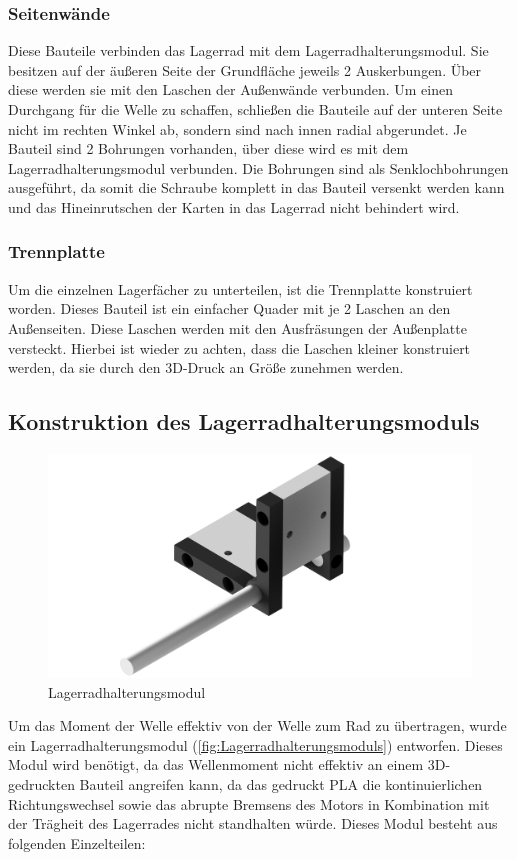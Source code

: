 \subsubsection{Seitenwände}
Diese Bauteile verbinden das Lagerrad mit dem Lagerradhalterungsmodul. Sie besitzen auf der äußeren Seite der Grundfläche
jeweils 2 Auskerbungen. Über diese werden sie mit den Laschen der Außenwände verbunden. Um einen Durchgang für die Welle zu schaffen,
schließen die Bauteile auf der unteren Seite nicht im rechten Winkel ab, sondern sind nach innen radial abgerundet.
Je Bauteil sind 2 Bohrungen vorhanden, über diese wird es mit dem Lagerradhalterungsmodul verbunden.
Die Bohrungen sind als Senklochbohrungen ausgeführt, da somit die Schraube komplett in das Bauteil versenkt werden kann
und das Hineinrutschen der Karten in das Lagerrad nicht behindert wird.

\subsubsection{Trennplatte}
Um die einzelnen Lagerfächer zu unterteilen, ist die Trennplatte konstruiert worden. Dieses Bauteil ist ein einfacher
Quader mit je 2 Laschen an den Außenseiten. Diese Laschen werden mit den Ausfräsungen der Außenplatte versteckt.
Hierbei ist wieder zu achten, dass die Laschen kleiner konstruiert werden, da sie durch den 3D-Druck an Größe zunehmen
werden.

\subsection{Konstruktion des Lagerradhalterungsmoduls}
\begin{figure}
    \includegraphics[width=8 cm]{fig/mech/LagerRadGruppekomplett}
    \caption{Lagerradhalterungsmodul}
    \label{fig:Lagerradhalterungsmoduls}
\end{figure}
Um das Moment der Welle effektiv von der Welle zum Rad zu übertragen, wurde ein Lagerradhalterungsmodul (\autoref{fig:Lagerradhalterungsmoduls}) entworfen. Dieses Modul wird
benötigt, da das Wellenmoment nicht effektiv an einem 3D-gedruckten Bauteil angreifen kann, da das gedruckt PLA
die kontinuierlichen Richtungswechsel sowie das abrupte Bremsens des Motors in Kombination mit der
Trägheit des Lagerrades nicht standhalten würde. Dieses Modul besteht aus folgenden Einzelteilen:

